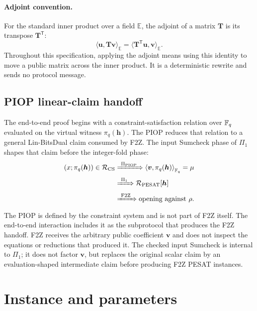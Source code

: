 \paragraph{Adjoint convention.}
For the standard inner product over a field $\mathbb E$, the adjoint of a
matrix $\bm T$ is its transpose $\bm T^{\mathsf T}$:
\begin{equation}
 \langle\bm u,\bm T\bm v\rangle_{\mathbb E}
 =\langle\bm T^{\mathsf T}\bm u,\bm v\rangle_{\mathbb E}.
 \label{eq:adjoint-convention}
\end{equation}
Throughout this specification, applying the adjoint means using this identity
to move a public matrix across the inner product.  It is a deterministic
rewrite and sends no protocol message.

\subsection{PIOP linear-claim handoff}
\label{sec:piop-handoff}

The end-to-end proof begins with a constraint-satisfaction relation over $\mathbb F_q$
evaluated on the virtual witness $\pi_q(\bm h)$.  The PIOP reduces that relation
to a general Lin-BitsDual claim consumed by F2Z.  The input Sumcheck phase of
$\Pi_1$ shapes that claim before the integer-fold phase:
\begin{equation}
 \begin{aligned}
  (x;\pi_q(\bm h))\in\mathcal R_{\rm CS}
  &\xRightarrow{\ \Pi_{\rm PIOP}\ }
    \left\langle\bm v,\pi_q(\bm h)\right\rangle_{\mathbb F_q}=\mu \\
  &\xRightarrow{\ \Pi_1\ }
    \mathcal R_{\rm PESAT}[\bm h] \\
  &\xRightarrow{\ \mathrm{F2Z}\ }
    \text{opening against $\rho$}.
 \end{aligned}
 \label{eq:piop-f2z-flow}
\end{equation}
The PIOP is defined by the constraint system and is not part of F2Z itself.
The end-to-end interaction includes it as the subprotocol that produces the
F2Z handoff.  F2Z receives the arbitrary public coefficient $\bm v$ and does
not inspect the equations or reductions that produced it.  The checked input
Sumcheck is internal to $\Pi_1$; it does
not factor $\bm v$, but replaces the original scalar claim by an
evaluation-shaped intermediate claim before producing F2Z PESAT instances.

\endgroup

\section{Instance and parameters}
\label{sec:instance}

